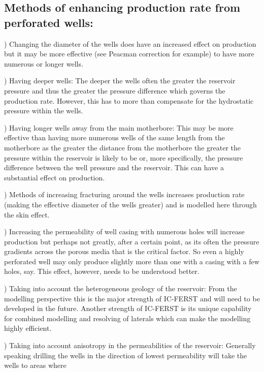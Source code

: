 \subsection{Methods of enhancing production rate from perforated wells:}
\label{Methods of enhancing production rate from perforated wells:}
\par{}) Changing the diameter of the wells does have an increased
effect on production but it may be more effective (see Peacman correction
for example) to have more numerous or longer wells.
\par{}) Having deeper wells: The deeper the wells often the greater the reservoir pressure
and thus the greater the pressure difference which governs the production rate.
However, this has to more than compensate for the hydrostatic pressure within the wells.
\par{}) Having longer wells away from the main motherbore: This may be more effective
than having more numerous wells of the same length from the motherbore as the
greater the distance from the motherbore the greater the pressure within the
reservoir is likely to be or, more specifically, the pressure difference between the
well pressure and the reservoir. This can have a substantial effect on production.
\par{}) Methods of increasing fracturing around the wells increases production rate (making the effective
diameter of the wells greater) and is modelled here through the skin effect.
\par{}) Increasing the permeability of well casing with numerous holes will increase production
but perhaps not greatly, after a certain point, as its often the pressure gradients
across the porous media that is the critical factor. So even a highly perforated well may only
produce slightly more than one with a casing with a few holes, say. This effect, however,
needs to be understood better.
\par{}) Taking into account the heterogeneous geology of the reservoir: From the modelling
perspective this is the major strength of IC-FERST and will need to be developed in the future.
Another strength of IC-FERST is its unique capability for combined modelling and resolving of laterals
which can make the modelling highly efficient.
\par{}) Taking into account anisotropy in the permeabilities of the reservoir: Generally speaking drilling
the wells in the direction of lowest permeability will take the wells to areas where
